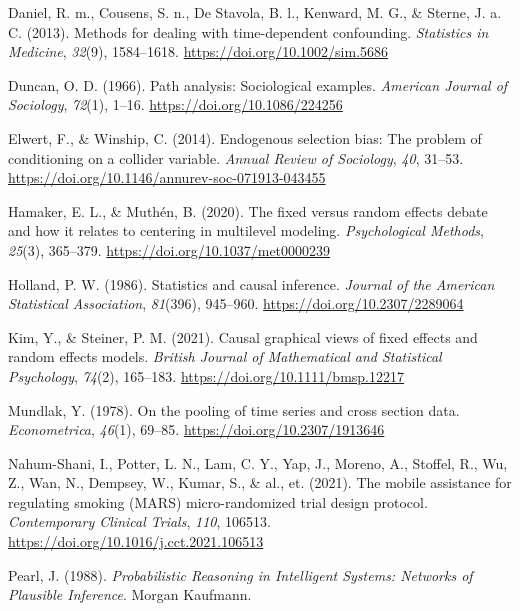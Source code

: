 \documentclass[
  11pt,
  a4paper,
]{article}
\newlength{\cslhangindent}
\newenvironment{CSLReferences}[2] %
 {\begin{list}{}{%
  \setlength{\itemindent}{0pt}
  \setlength{\leftmargin}{0pt}
  \setlength{\parsep}{0pt}
  \ifodd #1
   \setlength{\leftmargin}{\cslhangindent}
   \setlength{\itemindent}{-1\cslhangindent}
  \fi
  \setlength{\itemsep}{#2\baselineskip}}}
 {\end{list}}
\begin{document}
\begin{CSLReferences}{1}{0}
Daniel, R. m., Cousens, S. n., De Stavola, B. l., Kenward, M. G., \&
Sterne, J. a. C. (2013). Methods for dealing with time-dependent
confounding. \emph{Statistics in Medicine}, \emph{32}(9), 1584--1618.
\url{https://doi.org/10.1002/sim.5686}

Duncan, O. D. (1966). Path analysis: Sociological examples.
\emph{American Journal of Sociology}, \emph{72}(1), 1--16.
\url{https://doi.org/10.1086/224256}

Elwert, F., \& Winship, C. (2014). Endogenous selection bias: The
problem of conditioning on a collider variable. \emph{Annual Review of
Sociology}, \emph{40}, 31--53.
\url{https://doi.org/10.1146/annurev-soc-071913-043455}

Hamaker, E. L., \& Muthén, B. (2020). The fixed versus random effects
debate and how it relates to centering in multilevel modeling.
\emph{Psychological Methods}, \emph{25}(3), 365--379.
\url{https://doi.org/10.1037/met0000239}

Holland, P. W. (1986). Statistics and causal inference. \emph{Journal of
the American Statistical Association}, \emph{81}(396), 945--960.
\url{https://doi.org/10.2307/2289064}

Kim, Y., \& Steiner, P. M. (2021). Causal graphical views of fixed
effects and random effects models. \emph{British Journal of Mathematical
and Statistical Psychology}, \emph{74}(2), 165--183.
\url{https://doi.org/10.1111/bmsp.12217}

Mundlak, Y. (1978). On the pooling of time series and cross section
data. \emph{Econometrica}, \emph{46}(1), 69--85.
\url{https://doi.org/10.2307/1913646}

Nahum-Shani, I., Potter, L. N., Lam, C. Y., Yap, J., Moreno, A.,
Stoffel, R., Wu, Z., Wan, N., Dempsey, W., Kumar, S., \& al., et.
(2021). The mobile assistance for regulating smoking (MARS)
micro-randomized trial design protocol. \emph{Contemporary Clinical
Trials}, \emph{110}, 106513.
\url{https://doi.org/10.1016/j.cct.2021.106513}

Pearl, J. (1988). \emph{Probabilistic Reasoning in Intelligent Systems:
Networks of Plausible Inference}. Morgan Kaufmann.


\end{CSLReferences}
\end{document}

